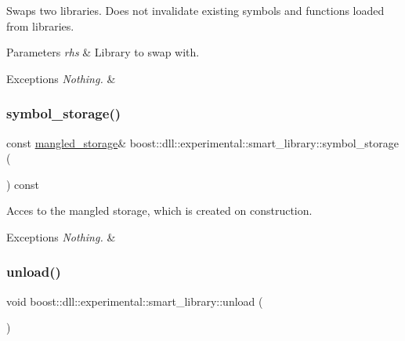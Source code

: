 Swaps two libraries. Does not invalidate existing symbols and functions loaded from libraries.


\begin{DoxyParams}{Parameters}
{\em rhs} & Library to swap with. \\
\hline
\end{DoxyParams}

\begin{DoxyExceptions}{Exceptions}
{\em Nothing.} & \\
\hline
\end{DoxyExceptions}
\mbox{\label{a01712_ae0f3bc6ca8cd617e7042457823d9f679}} 
\subsubsection{\texorpdfstring{symbol\+\_\+storage()}{symbol\_storage()}}
{\footnotesize\ttfamily const \hyperlink{a01364}{mangled\+\_\+storage}\& boost\+::dll\+::experimental\+::smart\+\_\+library\+::symbol\+\_\+storage (\begin{DoxyParamCaption}{ }\end{DoxyParamCaption}) const\hspace{0.3cm}{\ttfamily [inline]}}

Acces to the mangled storage, which is created on construction.


\begin{DoxyExceptions}{Exceptions}
{\em Nothing.} & \\
\hline
\end{DoxyExceptions}
\mbox{\label{a01712_a2b96d7817794a2adabe1f7bb22be5483}} 
\subsubsection{\texorpdfstring{unload()}{unload()}}
{\footnotesize\ttfamily void boost\+::dll\+::experimental\+::smart\+\_\+library\+::unload (\begin{DoxyParamCaption}{ }\end{DoxyParamCaption})\hspace{0.3cm}{\ttfamily [inline]}}





